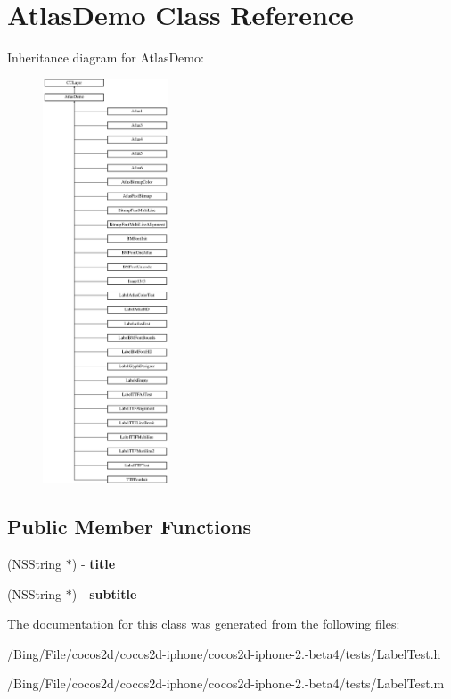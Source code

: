 \hypertarget{interface_atlas_demo}{\section{Atlas\-Demo Class Reference}
\label{interface_atlas_demo}
}
Inheritance diagram for Atlas\-Demo\-:\begin{figure}[H]
\begin{center}
\leavevmode
\includegraphics[height=12.000000cm]{interface_atlas_demo}
\end{center}
\end{figure}
\subsection*{Public Member Functions}
\begin{DoxyCompactItemize}
\item 
\hypertarget{interface_atlas_demo_a51a650c51f941f2b6a045a5c7ac32f28}{(N\-S\-String $\ast$) -\/ {\bfseries title}}\label{interface_atlas_demo_a51a650c51f941f2b6a045a5c7ac32f28}

\item 
\hypertarget{interface_atlas_demo_a1ca1fecc1fcd7ca47a748431cd5c6ec6}{(N\-S\-String $\ast$) -\/ {\bfseries subtitle}}\label{interface_atlas_demo_a1ca1fecc1fcd7ca47a748431cd5c6ec6}

\end{DoxyCompactItemize}


The documentation for this class was generated from the following files\-:\begin{DoxyCompactItemize}
\item 
/\-Bing/\-File/cocos2d/cocos2d-\/iphone/cocos2d-\/iphone-\/2.-\/beta4/tests/Label\-Test.\-h\item 
/\-Bing/\-File/cocos2d/cocos2d-\/iphone/cocos2d-\/iphone-\/2.-\/beta4/tests/Label\-Test.\-m\end{DoxyCompactItemize}
